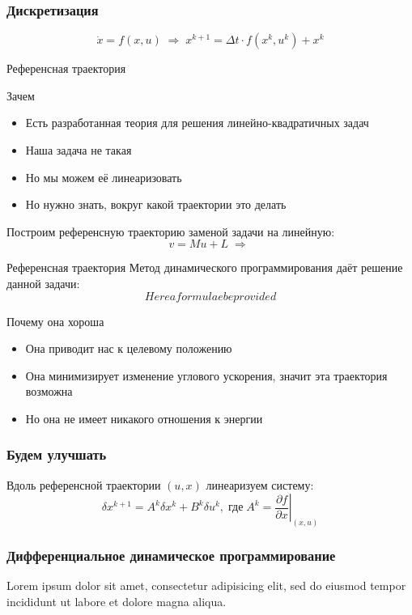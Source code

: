 \documentclass[16pt]{beamer}
\begin{document}
    \begin{frame}
        \frametitle{Дискретизация}
        $$
            \dot x = f(x, u)\;\Longrightarrow\; x^{k+1} = \Delta t \cdot f(x^{k}, u^{k}) + x^{k}
        $$
    \end{frame}

    \begin{frame}{Референсная траектория}
        \begin{block}{Зачем}
            \begin{itemize}
                \item Есть разработанная теория для решения линейно-квадратичных задач
                \item Наша задача не такая
                \item Но мы можем её линеаризовать
                \item Но нужно знать, вокруг какой траектории это делать
            \end{itemize}
        \end{block}
        Построим референсную траекторию заменой задачи на линейную:
        $$
            v = Mu + L\;\Longrightarrow\;
        $$
    \end{frame}

    \begin{frame}{Референсная траектория}
        Метод динамического программирования даёт решение данной задачи:
        $$
            Here a formulae be provided
        $$
        \begin{block}{Почему она хороша}
            \begin{itemize}
                \item Она приводит нас к целевому положению
                \item Она минимизирует изменение углового ускорения, значит эта траектория возможна
                \item Но она не имеет никакого отношения к энергии
            \end{itemize}
        \end{block}
    \end{frame}

    \begin{frame}
        \frametitle{Будем улучшать}
        Вдоль референсной траектории $(u,x)$ линеаризуем систему:
        $$
            \delta x^{k+1} = A^{k}\delta x^k + B^k \delta u^k,\;\mbox{где}\; A^k = \left.\frac{\partial f}{\partial x}\right|_{(x,u)}
        $$
    \end{frame}

    \begin{frame}
        \frametitle{Дифференциальное динамическое программирование}
        Lorem ipsum dolor sit amet, consectetur adipisicing elit, sed do eiusmod tempor incididunt ut labore et dolore magna aliqua.
    \end{frame}
\end{document}
